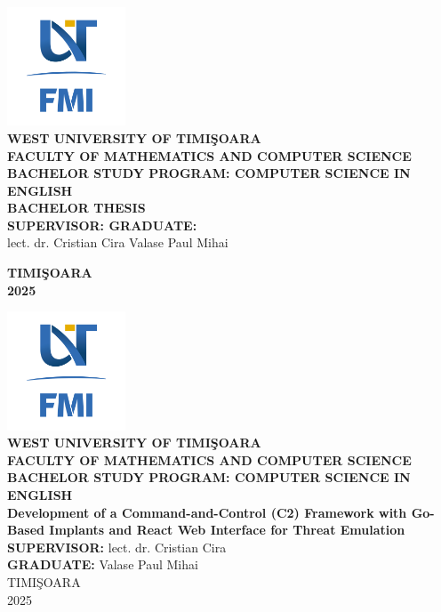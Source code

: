 \documentclass[12pt,a4paper,oneside,openany]{book}
\theoremstyle{definition}
\theoremstyle{remark}
\begin{document}

\thispagestyle{empty}
\begin{center}
\includegraphics[width=100pt]{includegraphics/uvt_logo.png} \\[2cm] %
{\large {\bf WEST UNIVERSITY OF TIMI\c SOARA \\
FACULTY OF MATHEMATICS AND COMPUTER SCIENCE \\
BACHELOR STUDY PROGRAM: COMPUTER SCIENCE IN ENGLISH}} \\[4cm]
{\huge {\bf BACHELOR THESIS}} \\[5cm]
{\large \bf SUPERVISOR: \hfill GRADUATE:} \\[0.5cm]
{\large lect. dr. Cristian Cira \hfill Valase Paul Mihai}
\end{center}
\vfill
\begin{center}
{\bf TIMI\c SOARA \\ 2025} %
\end{center}
\clearpage

\begin{titlepage}
\centering
\includegraphics[width=100pt]{includegraphics/uvt_logo.png} \\[2cm] %
{\large \textbf{WEST UNIVERSITY OF TIMIŞOARA}} \\
\large \textbf{FACULTY OF MATHEMATICS AND COMPUTER SCIENCE} \\
\large \textbf{BACHELOR STUDY PROGRAM: COMPUTER SCIENCE IN ENGLISH} \\[2cm]
{\Huge \textbf{Development of a Command-and-Control (C2) Framework with Go-Based Implants and React Web Interface for Threat Emulation}} \\[1cm] %
{\large \textbf{SUPERVISOR:} lect. dr. Cristian Cira} \\[0.5cm]
{\large \textbf{GRADUATE:} Valase Paul Mihai} \\[5cm]
{\large TIMIŞOARA \\ 2025} %
\end{titlepage}
\clearpage
\end{document}
